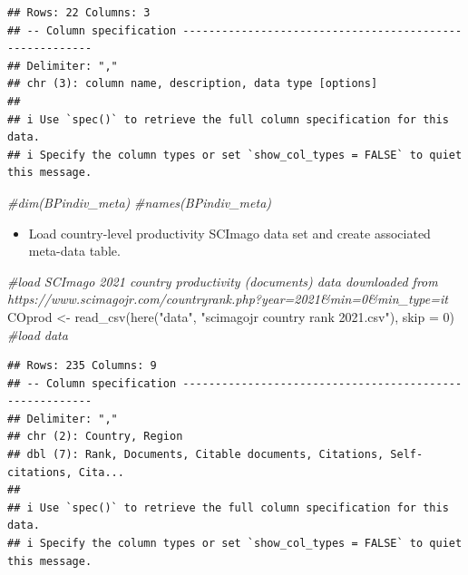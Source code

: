 \documentclass[
]{article}
\newenvironment{Shaded}{\begin{snugshade}}{\end{snugshade}}
\newcommand{\AttributeTok}[1]{\textcolor[rgb]{0.77,0.63,0.00}{#1}}
\newcommand{\CommentTok}[1]{\textcolor[rgb]{0.56,0.35,0.01}{\textit{#1}}}
\newcommand{\DecValTok}[1]{\textcolor[rgb]{0.00,0.00,0.81}{#1}}
\newcommand{\FunctionTok}[1]{\textcolor[rgb]{0.00,0.00,0.00}{#1}}
\newcommand{\NormalTok}[1]{#1}
\newcommand{\OtherTok}[1]{\textcolor[rgb]{0.56,0.35,0.01}{#1}}
\newcommand{\StringTok}[1]{\textcolor[rgb]{0.31,0.60,0.02}{#1}}
\providecommand{\tightlist}{%
  \setlength{\itemsep}{0pt}\setlength{\parskip}{0pt}}
\begin{document}
\begin{verbatim}
## Rows: 22 Columns: 3
## -- Column specification --------------------------------------------------------
## Delimiter: ","
## chr (3): column name, description, data type [options]
## 
## i Use `spec()` to retrieve the full column specification for this data.
## i Specify the column types or set `show_col_types = FALSE` to quiet this message.
\end{verbatim}

\begin{Shaded}
\begin{Highlighting}[]
\CommentTok{\#dim(BPindiv\_meta)}
\CommentTok{\#names(BPindiv\_meta)}
\end{Highlighting}
\end{Shaded}

\begin{itemize}
\tightlist
\item
  Load country-level productivity SCImago data set and create associated
  meta-data table.
\end{itemize}

\begin{Shaded}
\begin{Highlighting}[]
\CommentTok{\#load SCImago 2021 country productivity (documents) data downloaded from https://www.scimagojr.com/countryrank.php?year=2021\&min=0\&min\_type=it}
\NormalTok{COprod }\OtherTok{\textless{}{-}} \FunctionTok{read\_csv}\NormalTok{(}\FunctionTok{here}\NormalTok{(}\StringTok{"data"}\NormalTok{, }\StringTok{"scimagojr country rank 2021.csv"}\NormalTok{), }\AttributeTok{skip =} \DecValTok{0}\NormalTok{) }\CommentTok{\#load data}
\end{Highlighting}
\end{Shaded}

\begin{verbatim}
## Rows: 235 Columns: 9
## -- Column specification --------------------------------------------------------
## Delimiter: ","
## chr (2): Country, Region
## dbl (7): Rank, Documents, Citable documents, Citations, Self-citations, Cita...
## 
## i Use `spec()` to retrieve the full column specification for this data.
## i Specify the column types or set `show_col_types = FALSE` to quiet this message.
\end{verbatim}
\end{document}
